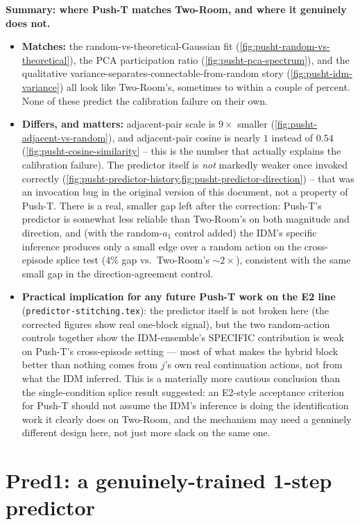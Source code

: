 \documentclass[11pt]{article}
\begin{document}
\textbf{Summary: where Push-T matches Two-Room, and where it genuinely does not.}
\begin{itemize}[leftmargin=1.4em,itemsep=2pt]
\item \textbf{Matches:} the random-vs-theoretical-Gaussian fit
(\cref{fig:pusht-random-vs-theoretical}), the PCA participation ratio
(\cref{fig:pusht-pca-spectrum}), and the qualitative variance-separates-connectable-from-random
story (\cref{fig:pusht-idm-variance}) all look like Two-Room's, sometimes to within a couple
of percent. None of these predict the calibration failure on their own.
\item \textbf{Differs, and matters:} adjacent-pair scale is $9\times$ smaller
(\cref{fig:pusht-adjacent-vs-random}), and adjacent-pair cosine is nearly $1$ instead of
$0.54$ (\cref{fig:pusht-cosine-similarity} -- this is the number that actually explains the
calibration failure). The predictor itself is \emph{not} markedly weaker once invoked
correctly (\cref{fig:pusht-predictor-history,fig:pusht-predictor-direction}) -- that was an
invocation bug in the original version of this document, not a property of Push-T. There is
a real, smaller gap left after the correction: Push-T's predictor is somewhat less reliable
than Two-Room's on both magnitude and direction, and (with the random-$a_1$ control added)
the IDM's specific inference produces only a small edge over a random action on the
cross-episode splice test ($4\%$ gap vs.\ Two-Room's $\sim\!2\times$), consistent with the
same small gap in the direction-agreement control.
\item \textbf{Practical implication for any future Push-T work on the E2 line}
(\texttt{predictor-stitching.tex}): the predictor itself is not broken here (the corrected
figures show real one-block signal), but the two random-action controls together show the
IDM-ensemble's SPECIFIC contribution is weak on Push-T's cross-episode setting --- most of
what makes the hybrid block better than nothing comes from $j$'s own real continuation
actions, not from what the IDM inferred. This is a materially more cautious conclusion than
the single-condition splice result suggested: an E2-style acceptance criterion for Push-T
should not assume the IDM's inference is doing the identification work it clearly does on
Two-Room, and the mechanism may need a genuinely different design here, not just more slack
on the same one.
\end{itemize}

\section{Pred1: a genuinely-trained 1-step predictor}
\label{sec:pred1}
\end{document}
